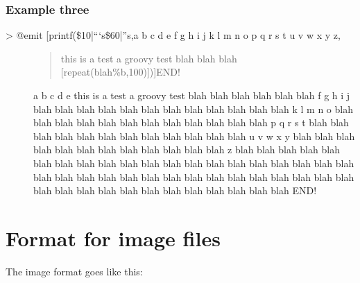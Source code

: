 \documentclass[letterpaper,10pt,english]{sphinxmanual}
\begin{document}
\subsubsection{Example three}
\label{\detokenize{advanced:example-three}}\begin{description}
\item[{\textgreater{} @emit {[}printf(\$\sphinxhyphen{}10|“‘s\$\sphinxhyphen{}60|”s,a b c d e f g h i j k l m n o p q r s t u v w x y z,}] \leavevmode\begin{quote}

\sphinxAtStartPar
this is a test a groovy test blah blah blah {[}repeat(blah\%b,100){]}){]}END!
\end{quote}

\sphinxAtStartPar
a b c d e this is a test a groovy test blah blah blah blah blah blah
f g h i j blah blah blah blah blah blah blah blah blah blah blah blah
k l m n o blah blah blah blah blah blah blah blah blah blah blah blah
p q r s t blah blah blah blah blah blah blah blah blah blah blah blah
u v w x y blah blah blah blah blah blah blah blah blah blah blah blah
z         blah blah blah blah blah blah blah blah blah blah blah blah
blah blah blah blah blah blah blah blah blah blah blah blah blah blah
blah blah blah blah blah blah blah blah blah blah blah blah blah blah
blah blah blah blah blah blah blah                                    END!

\end{description}


\section{Format for image files}
\label{\detokenize{advanced:format-for-image-files}}
\sphinxAtStartPar
The image format goes like this:
\end{document}
